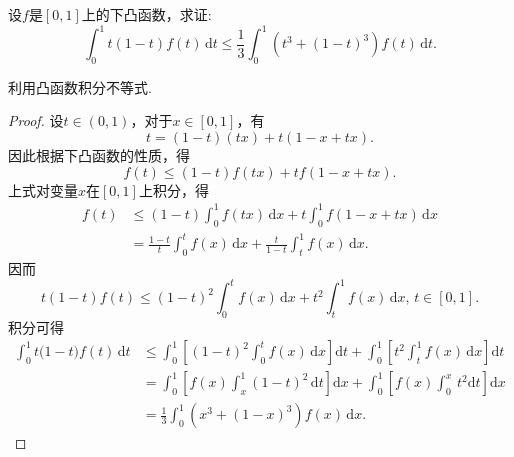 \documentclass[../../main.tex]{subfiles}%
\begin{document}
\begin{example}
设\( f \)是\([0,1]\)上的下凸函数，求证:
\[
\int_0^1 t(1-t)f(t)\,\text{d}t \leqslant \frac{1}{3}\int_0^1 \left(t^3 + (1-t)^3\right)f(t)\,\text{d}t.
\]
\end{example}
\begin{note}
利用凸函数积分不等式.
\end{note}
\begin{proof}
设\( t \in (0,1) \)，对于\( x \in [0,1] \)，有
\[
t = (1-t)(tx) + t(1 - x + tx).
\]
因此根据下凸函数的性质，得
\[
f(t) \leqslant (1-t)f(tx) + tf(1 - x + tx).
\]
上式对变量\( x \)在\([0,1]\)上积分，得
\begin{align*}
f(t) &\leqslant (1-t)\int_0^1 f(tx)\,\text{d}x + t\int_0^1 f(1 - x + tx)\,\text{d}x \\
&= \frac{1-t}{t} \int_0^t f(x)\,\text{d}x + \frac{t}{1-t}\int_t^1 f(x)\,\text{d}x.
\end{align*}
因而
\[
t(1-t)f(t) \leqslant (1-t)^2\int_0^t f(x)\,\text{d}x + t^2\int_t^1 f(x)\,\text{d}x, \, t \in [0,1].
\]
积分可得
\begin{align*}
\int_0^1{t(1}-t)f(t)\,\mathrm{d}t&\leqslant \int_0^1{\left[ (1-t)^2\int_0^t{f(x)\,\mathrm{d}x} \right] \mathrm{d}t}+\int_0^1{\left[ t^2\int_t^1{f(x)\,\mathrm{d}x} \right] \mathrm{d}t}
\\
&=\int_0^1{\left[ f\left( x \right) \int_x^1{(1-t)^2\,\mathrm{d}t} \right] \mathrm{d}x}+\int_0^1{\left[ f(x)\int_0^x{\,t^2\mathrm{d}t} \right] \mathrm{d}x}
\\
&=\frac{1}{3}\int_0^1{\left( x^3+(1-x)^3 \right) f(x)\,\mathrm{d}x}.
\end{align*}
\end{proof}
\end{document}
